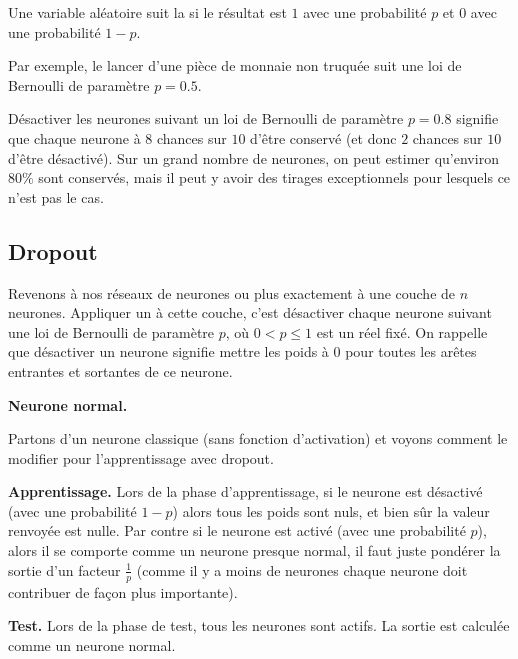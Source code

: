 \documentclass[11pt,class=report,crop=false]{standalone}
\begin{document}
Une variable aléatoire suit la  si le résultat est $1$ avec une probabilité $p$ et $0$ avec une probabilité $1-p$.

Par exemple, le lancer d'une pièce de monnaie non truquée suit une loi de Bernoulli de paramètre $p=0.5$.

Désactiver les neurones suivant un loi de Bernoulli de paramètre $p=0.8$ signifie que chaque neurone à $8$ chances sur $10$ d'être conservé (et donc $2$ chances sur $10$ d'être désactivé).
Sur un grand nombre de neurones, on peut estimer qu'environ $80\%$ sont conservés, mais il peut y avoir des tirages exceptionnels pour lesquels ce n'est pas le cas.


\subsection{Dropout}

Revenons à nos réseaux de neurones ou plus exactement à une couche de $n$ neurones.
Appliquer un  à cette couche, c'est désactiver chaque neurone suivant une loi de Bernoulli de paramètre $p$, où $0 < p \le 1$ est un réel fixé.
On rappelle que désactiver un neurone signifie mettre les poids à $0$ pour toutes les arêtes entrantes et sortantes de ce neurone.


\textbf{Neurone \og{}normal\fg{}.}

Partons d'un neurone classique (sans fonction d'activation) et voyons comment le modifier pour l'apprentissage avec dropout.




\textbf{Apprentissage.}
Lors de la phase d'apprentissage, si le neurone est désactivé (avec une probabilité $1-p$) alors tous les poids sont nuls, et bien sûr la valeur renvoyée est nulle.
Par contre si le neurone est activé (avec une probabilité $p$), alors il se comporte comme un neurone \og{}presque normal\fg{}, il faut juste pondérer la sortie d'un facteur $\frac1p$ (comme il y a moins de neurones chaque neurone doit contribuer de façon plus importante).



\textbf{Test.}
Lors de la phase de test, tous les neurones sont actifs. La sortie est calculée comme un neurone normal.

\end{document}

